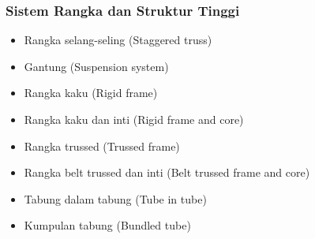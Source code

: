 \documentclass[../skb.tex]{subfiles}
\begin{document}
\begin{frame}[t,mycolor=digiPH_leaf,mytitle=standard,dark]
	\frametitle{Sistem Rangka dan Struktur Tinggi}

	\begin{itemize}
		\item Rangka selang-seling (Staggered truss)
		\item Gantung (Suspension system)
		\item Rangka kaku (Rigid frame)
		\item Rangka kaku dan inti (Rigid frame and core)
		\item Rangka trussed (Trussed frame)
		\item Rangka belt trussed dan inti (Belt trussed frame and core)
		\item Tabung dalam tabung (Tube in tube)
		\item Kumpulan tabung (Bundled tube)
	\end{itemize}

\end{frame}

\begin{frame}[t,mybg=pg_8_1,mytitle=standard,dark]\end{frame}
\begin{frame}[c,mycolor=digiPH_white,mytitle=standard,light]
\end{frame}
\begin{frame}[t,mybg=pg_8_3,mytitle=standard,dark]\end{frame}
\begin{frame}[t,mybg=pg_8_4,mytitle=standard,dark] \end{frame}











\end{document}
